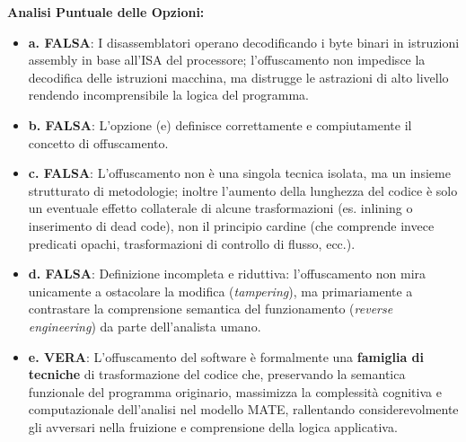 \documentclass[11pt,a4paper]{article}
\begin{document}
\begin{solutionbox}
\textbf{Analisi Puntuale delle Opzioni:}
\begin{itemize}
    \item \textbf{a. FALSA}: I disassemblatori operano decodificando i byte binari in istruzioni assembly in base all'ISA del processore; l'offuscamento non impedisce la decodifica delle istruzioni macchina, ma distrugge le astrazioni di alto livello rendendo incomprensibile la logica del programma.
    \item \textbf{b. FALSA}: L'opzione (e) definisce correttamente e compiutamente il concetto di offuscamento.
    \item \textbf{c. FALSA}: L'offuscamento non \`e una singola tecnica isolata, ma un insieme strutturato di metodologie; inoltre l'aumento della lunghezza del codice \`e solo un eventuale effetto collaterale di alcune trasformazioni (es. inlining o inserimento di dead code), non il principio cardine (che comprende invece predicati opachi, trasformazioni di controllo di flusso, ecc.).
    \item \textbf{d. FALSA}: Definizione incompleta e riduttiva: l'offuscamento non mira unicamente a ostacolare la modifica (\textit{tampering}), ma primariamente a contrastare la comprensione semantica del funzionamento (\textit{reverse engineering}) da parte dell'analista umano.
    \item \textbf{e. VERA}: L'offuscamento del software \`e formalmente una \textbf{famiglia di tecniche} di trasformazione del codice che, preservando la semantica funzionale del programma originario, massimizza la complessit\`a cognitiva e computazionale dell'analisi nel modello MATE, rallentando considerevolmente gli avversari nella fruizione e comprensione della logica applicativa.
\end{itemize}
\end{solutionbox}
\end{document}
